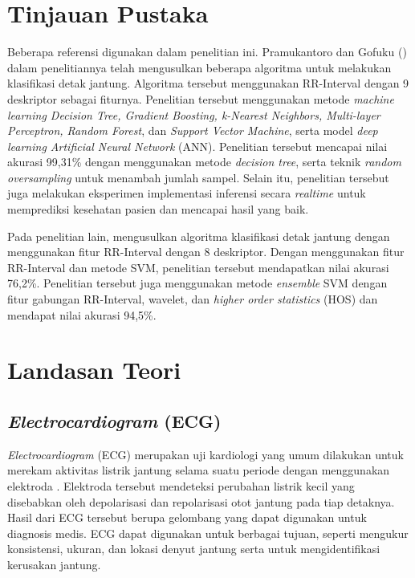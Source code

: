 



\section{Tinjauan Pustaka}

Beberapa referensi digunakan dalam penelitian ini. Pramukantoro dan Gofuku (\citeyear{pramukantoroHeartbeatClassifierContinuous2022}) dalam penelitiannya telah mengusulkan beberapa algoritma untuk melakukan klasifikasi detak jantung. Algoritma tersebut menggunakan RR-Interval dengan 9 deskriptor sebagai fiturnya. Penelitian tersebut menggunakan metode \textit{machine learning Decision Tree, Gradient Boosting, k-Nearest Neighbors, Multi-layer Perceptron, Random Forest}, dan \textit{Support Vector Machine}, serta model \textit{deep learning Artificial Neural Network} (ANN). Penelitian tersebut mencapai nilai akurasi 99,31\% dengan menggunakan metode \textit{decision tree}, serta teknik \textit{random oversampling} untuk menambah jumlah sampel. Selain itu, penelitian tersebut juga melakukan eksperimen implementasi inferensi secara \textit{realtime} untuk memprediksi kesehatan pasien dan mencapai hasil yang baik.

Pada penelitian lain, \textcite{mondejar-guerraHeartbeatClassificationFusing2019} mengusulkan algoritma klasifikasi detak jantung dengan menggunakan fitur RR-Interval dengan 8 deskriptor. Dengan menggunakan fitur RR-Interval dan metode SVM, penelitian tersebut mendapatkan nilai akurasi 76,2\%. Penelitian tersebut juga menggunakan metode \textit{ensemble} SVM dengan fitur gabungan RR-Interval, wavelet, dan \textit{higher order statistics} (HOS) dan mendapat nilai akurasi 94,5\%.

\section{Landasan Teori}


\subsection{\emph{Electrocardiogram} (ECG)}
\label{subsec: landasan-ecg}

\textit{Electrocardiogram} (ECG) merupakan uji kardiologi yang umum dilakukan untuk merekam aktivitas listrik jantung selama suatu periode dengan menggunakan elektroda \parencite{yoonDeepLearningbasedElectrocardiogram2019}. Elektroda tersebut mendeteksi perubahan listrik kecil yang disebabkan oleh depolarisasi dan repolarisasi otot jantung pada tiap detaknya. Hasil dari ECG tersebut berupa gelombang yang dapat digunakan untuk diagnosis medis. ECG dapat digunakan untuk berbagai tujuan, seperti mengukur konsistensi, ukuran, dan lokasi denyut jantung serta untuk mengidentifikasi kerusakan jantung. 


